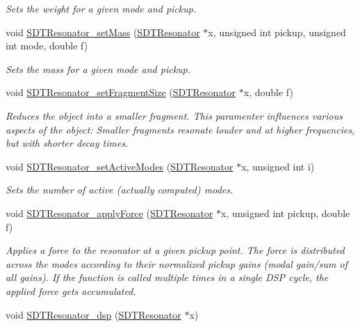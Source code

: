 \begin{DoxyCompactItemize}
\begin{DoxyCompactList}\small\item\em Sets the weight for a given mode and pickup. \end{DoxyCompactList}\item 
void \hyperlink{group__resonators_ga4759c63641f563f80566fbfff25614af}{S\+D\+T\+Resonator\+\_\+set\+Mass} (\hyperlink{group__resonators_ga07d183de45e9713277c8f62d93d9be9c}{S\+D\+T\+Resonator} $\ast$x, unsigned int pickup, unsigned int mode, double f)
\begin{DoxyCompactList}\small\item\em Sets the mass for a given mode and pickup. \end{DoxyCompactList}\item 
void \hyperlink{group__resonators_gac5470752ba965676b14985d17d371f10}{S\+D\+T\+Resonator\+\_\+set\+Fragment\+Size} (\hyperlink{group__resonators_ga07d183de45e9713277c8f62d93d9be9c}{S\+D\+T\+Resonator} $\ast$x, double f)
\begin{DoxyCompactList}\small\item\em Reduces the object into a smaller fragment. This paramenter influences various aspects of the object\+: Smaller fragments resonate louder and at higher frequencies, but with shorter decay times. \end{DoxyCompactList}\item 
void \hyperlink{group__resonators_ga37a78caeccdbaefbc4b7f842b110b7ee}{S\+D\+T\+Resonator\+\_\+set\+Active\+Modes} (\hyperlink{group__resonators_ga07d183de45e9713277c8f62d93d9be9c}{S\+D\+T\+Resonator} $\ast$x, unsigned int i)
\begin{DoxyCompactList}\small\item\em Sets the number of active (actually computed) modes. \end{DoxyCompactList}\item 
void \hyperlink{group__resonators_ga9d63332360ee72a9bbcb1dcd85d877a5}{S\+D\+T\+Resonator\+\_\+apply\+Force} (\hyperlink{group__resonators_ga07d183de45e9713277c8f62d93d9be9c}{S\+D\+T\+Resonator} $\ast$x, unsigned int pickup, double f)
\begin{DoxyCompactList}\small\item\em Applies a force to the resonator at a given pickup point. The force is distributed across the modes according to their normalized pickup gains (modal gain/sum of all gains). If the function is called multiple times in a single D\+S\+P cycle, the applied force gets accumulated. \end{DoxyCompactList}\item 
\hypertarget{group__resonators_ga5aff90f4cf699af25c1b30b81a05f693}{}void \hyperlink{group__resonators_ga5aff90f4cf699af25c1b30b81a05f693}{S\+D\+T\+Resonator\+\_\+dsp} (\hyperlink{group__resonators_ga07d183de45e9713277c8f62d93d9be9c}{S\+D\+T\+Resonator} $\ast$x)\label{group__resonators_ga5aff90f4cf699af25c1b30b81a05f693}


\end{DoxyCompactItemize}
